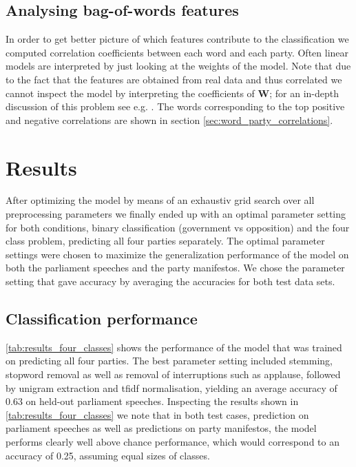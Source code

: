 \documentclass{article} %
\renewcommand{\vec}[1]{\mathbf{#1}}
\begin{document}
\subsection{Analysing bag-of-words features}
In order to get  better picture of which features contribute to the classification we computed correlation coefficients between each word and each party. Often linear models are interpreted by just looking at the weights of the model. Note that due to the fact that the features are obtained from real data and thus correlated we cannot inspect the model by interpreting the coefficients of $\vec{W}$; for an in-depth discussion of this problem see e.g. \cite{Haufe2013}. The words corresponding to the top positive and negative correlations are shown in section \autoref{sec:word_party_correlations}.

\section{Results}
After optimizing the model by means of an exhaustiv grid search over all preprocessing parameters we finally ended up with an optimal parameter setting for both conditions, binary classification (government vs opposition) and the four class problem, predicting all four parties separately. The optimal parameter settings were chosen to maximize the generalization performance of the model on both the parliament speeches and the party manifestos. We chose the parameter setting that gave accuracy by averaging the accuracies for both test data sets. 

\subsection{Classification performance}
\autoref{tab:results_four_classes} shows the performance of the model that was trained on predicting all four parties. The best parameter setting included stemming, stopword removal as well as removal of interruptions such as applause, followed by unigram extraction and tfidf normalisation, yielding an average accuracy of 0.63 on held-out parliament speeches. Inspecting the results shown in \autoref{tab:results_four_classes} we note that in both test cases, prediction on parliament speeches as well as predictions on party manifestos, the model performs clearly well above chance performance, which would correspond to an accuracy of 0.25, assuming equal sizes of classes. 

\end{document}
